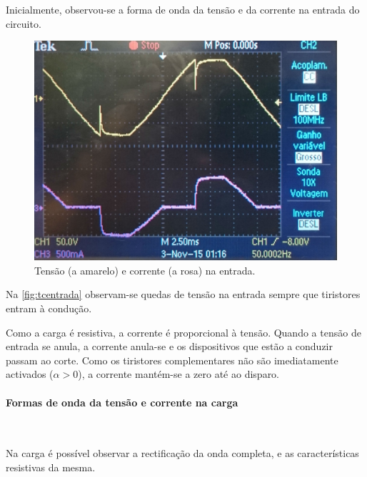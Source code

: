 \documentclass[a4paper,11pt]{article}
\numberwithin{equation}{section}
\begin{document}
Inicialmente, observou-se a forma de onda da tensão e da corrente na entrada do circuito.

\begin{figure}[H]
	\centering
	\includegraphics[keepaspectratio=true, scale=0.12]{img/DSC_0181}
	\caption{Tensão (a amarelo) e corrente (a rosa) na entrada.}
	\label{fig:tcentrada}
	\vspace{-0.8em}
\end{figure}

Na \autoref{fig:tcentrada} observam-se quedas de tensão na entrada sempre que tiristores entram à condução. 

Como a carga é resistiva, a corrente é proporcional à tensão. Quando a tensão de entrada se anula, a corrente anula-se e os dispositivos que estão a conduzir passam ao corte. Como os tiristores complementares não são imediatamente activados ($\alpha > 0$), a corrente mantém-se a zero até ao disparo.

\paragraph{Formas de onda da tensão e corrente na carga} \mbox{}\

Na carga é possível observar a rectificação da onda completa, e as características resistivas da mesma.
\end{document}
